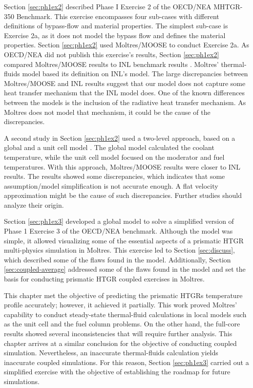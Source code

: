 Section \ref{sec:ph1ex2} described Phase I Exercise 2 of the OECD/NEA MHTGR-350 Benchmark.
This exercise encompasses four sub-cases with different definitions of bypass-flow and material properties.
The simplest sub-case is Exercise 2a, as it does not model the bypass flow and defines the material properties.
Section \ref{sec:ph1ex2} used Moltres/MOOSE to conduct Exercise 2a.
As OECD/NEA did not publish this exercise’s results, Section \ref{sec:ph1ex2} compared Moltres/MOOSE results to INL benchmark results \cite{strydom_inl_2013}.
Moltres' thermal-fluids model based its definition on INL's model.
The large discrepancies between Moltres/MOOSE and INL results suggest that our model does not capture some heat transfer mechanism that the INL model does.
One of the known differences between the models is the inclusion of the radiative heat transfer mechanism.
As Moltres does not model that mechanism, it could be the cause of the discrepancies.

A second study in Section \ref{sec:ph1ex2} used a two-level approach, based on a global and a unit cell model \cite{stainsby_investigation_2008}.
The global model calculated the coolant temperature, while the unit cell model focused on the moderator and fuel temperatures.
With this approach, Moltres/MOOSE results were closer to INL results.
The results showed some discrepancies, which indicates that some assumption/model simplification is not accurate enough.
A flat velocity approximation might be the cause of such discrepancies.
Further studies should analyze their origin.

Section \ref{sec:ph1ex3} developed a global model to solve a simplified version of Phase 1 Exercise 3 of the OECD/NEA benchmark.
Although the model was simple, it allowed visualizing some of the essential aspects of a prismatic HTGR multi-physics simulation in Moltres.
This exercise led to Section \ref{sec:discuss}, which described some of the flaws found in the model.
Additionally, Section \ref{sec:coupled-average} addressed some of the flaws found in the model and set the basis for conducting prismatic HTGR coupled exercises in Moltres.

This chapter met the objective of predicting the prismatic HTGRs temperature profile accurately; however, it achieved it partially.
This work proved Moltres' capability to conduct steady-state thermal-fluid calculations in local models such as the unit cell and the fuel column problems.
On the other hand, the full-core results showed several inconsistencies that will require further analysis.
This chapter arrives at a similar conclusion for the objective of conducting coupled simulation.
Nevertheless, an inaccurate thermal-fluids calculation yields inaccurate coupled simulations.
For this reason, Section \ref{sec:ph1ex3} carried out a simplified exercise with the objective of establishing the roadmap for future simulations.
